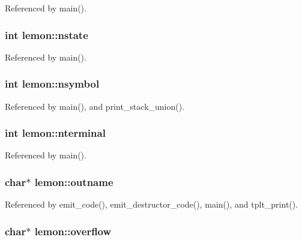 Referenced by main().

\hypertarget{structlemon_a04dc7916df27637312d97cd0e56a2587}{
\subsubsection[{nstate}]{\setlength{\rightskip}{0pt plus 5cm}int lemon\-::nstate}}\label{structlemon_a04dc7916df27637312d97cd0e56a2587}


Referenced by main().

\hypertarget{structlemon_ab4d4f29008ddd135a5b66e0b2d48c2bf}{
\subsubsection[{nsymbol}]{\setlength{\rightskip}{0pt plus 5cm}int lemon\-::nsymbol}}\label{structlemon_ab4d4f29008ddd135a5b66e0b2d48c2bf}


Referenced by main(), and print\-\_\-stack\-\_\-union().

\hypertarget{structlemon_acce4d604b00b21238262f51cf2d5c7cc}{
\subsubsection[{nterminal}]{\setlength{\rightskip}{0pt plus 5cm}int lemon\-::nterminal}}\label{structlemon_acce4d604b00b21238262f51cf2d5c7cc}


Referenced by main().

\hypertarget{structlemon_a6f5387bcd6ed98e3e0455b4ef410b699}{
\subsubsection[{outname}]{\setlength{\rightskip}{0pt plus 5cm}char$\ast$ lemon\-::outname}}\label{structlemon_a6f5387bcd6ed98e3e0455b4ef410b699}


Referenced by emit\-\_\-code(), emit\-\_\-destructor\-\_\-code(), main(), and tplt\-\_\-print().

\hypertarget{structlemon_a9e2f1ac643c894788e3833d66cf96467}{
\subsubsection[{overflow}]{\setlength{\rightskip}{0pt plus 5cm}char$\ast$ lemon\-::overflow}}\label{structlemon_a9e2f1ac643c894788e3833d66cf96467}



